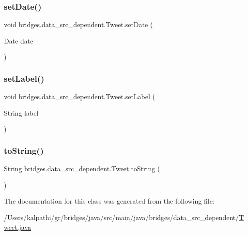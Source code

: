 \mbox{\label{classbridges_1_1data__src__dependent_1_1_tweet_a1a57c028bb87ad4e94af496a7260ffe9}} 
\subsubsection{\texorpdfstring{setDate()}{setDate()}}
{\footnotesize\ttfamily void bridges.\+data\+\_\+src\+\_\+dependent.\+Tweet.\+set\+Date (\begin{DoxyParamCaption}\item[{Date}]{date }\end{DoxyParamCaption})}

\mbox{\label{classbridges_1_1data__src__dependent_1_1_tweet_aa193633f4f61cc957f05a1c551f18822}} 
\subsubsection{\texorpdfstring{setLabel()}{setLabel()}}
{\footnotesize\ttfamily void bridges.\+data\+\_\+src\+\_\+dependent.\+Tweet.\+set\+Label (\begin{DoxyParamCaption}\item[{String}]{label }\end{DoxyParamCaption})}

\mbox{\label{classbridges_1_1data__src__dependent_1_1_tweet_adfba67504a7463a7f16aff46d2bb893f}} 
\subsubsection{\texorpdfstring{toString()}{toString()}}
{\footnotesize\ttfamily String bridges.\+data\+\_\+src\+\_\+dependent.\+Tweet.\+to\+String (\begin{DoxyParamCaption}{ }\end{DoxyParamCaption})}



The documentation for this class was generated from the following file\+:\begin{DoxyCompactItemize}
\item 
/\+Users/kalpathi/gr/bridges/java/src/main/java/bridges/data\+\_\+src\+\_\+dependent/\mbox{\hyperlink{_tweet_8java}{Tweet.\+java}}\end{DoxyCompactItemize}
